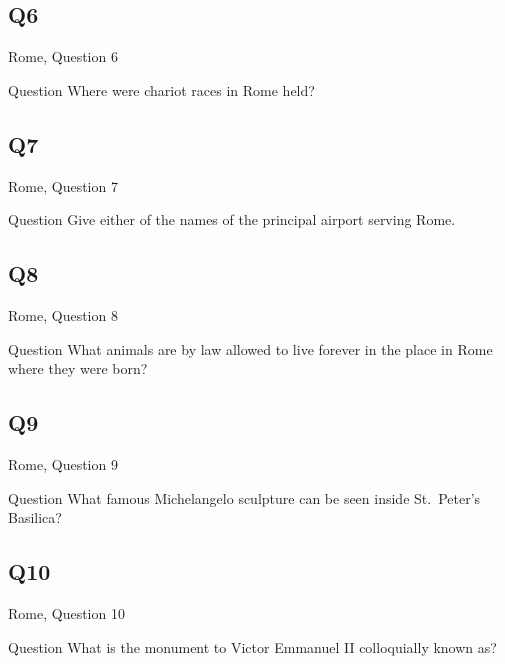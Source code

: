 \documentclass[11pt]{beamer}
\begin{document}
\subsection*{Q6}
\begin{frame}[t]{Rome, Question 6}
\begin{block}{Question}
Where were chariot races in Rome held?
\end{block}
\end{frame}
\subsection*{Q7}
\begin{frame}[t]{Rome, Question 7}
\begin{block}{Question}
Give either of the names of the principal airport serving Rome.
\end{block}
\end{frame}
\subsection*{Q8}
\begin{frame}[t]{Rome, Question 8}
\begin{block}{Question}
What animals are by law allowed to live forever in the place in Rome where they were born?
\end{block}
\end{frame}
\subsection*{Q9}
\begin{frame}[t]{Rome, Question 9}
\begin{block}{Question}
What famous Michelangelo sculpture can be seen inside St.\ Peter's Basilica?  
\end{block}
\end{frame}
\subsection*{Q10}
\begin{frame}[t]{Rome, Question 10}
\begin{block}{Question}
What is the monument to Victor Emmanuel II colloquially known as?
\end{block}
\end{frame}
\end{document}
